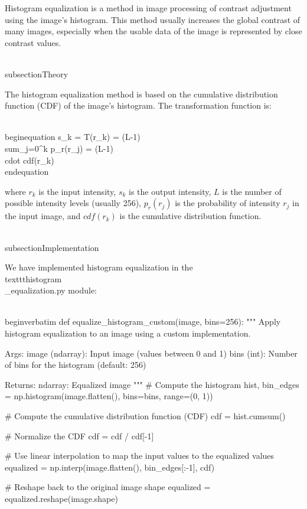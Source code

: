 Histogram equalization is a method in image processing of contrast adjustment using the image's histogram. This method usually increases the global contrast of many images, especially when the usable data of the image is represented by close contrast values.

\\subsection{Theory}

The histogram equalization method is based on the cumulative distribution function (CDF) of the image's histogram. The transformation function is:

\\begin{equation}
s_k = T(r_k) = (L-1) \\sum_{j=0}^{k} p_r(r_j) = (L-1) \\cdot cdf(r_k)
\\end{equation}

where $r_k$ is the input intensity, $s_k$ is the output intensity, $L$ is the number of possible intensity levels (usually 256), $p_r(r_j)$ is the probability of intensity $r_j$ in the input image, and $cdf(r_k)$ is the cumulative distribution function.

\\subsection{Implementation}

We have implemented histogram equalization in the \\texttt{histogram\\_equalization.py} module:

\\begin{verbatim}
def equalize_histogram_custom(image, bins=256):
    """
    Apply histogram equalization to an image using a custom implementation.
    
    Args:
        image (ndarray): Input image (values between 0 and 1)
        bins (int): Number of bins for the histogram (default: 256)
        
    Returns:
        ndarray: Equalized image
    """
    # Compute the histogram
    hist, bin_edges = np.histogram(image.flatten(), bins=bins, range=(0, 1))
    
    # Compute the cumulative distribution function (CDF)
    cdf = hist.cumsum()
    
    # Normalize the CDF
    cdf = cdf / cdf[-1]
    
    # Use linear interpolation to map the input values to the equalized values
    equalized = np.interp(image.flatten(), bin_edges[:-1], cdf)
    
    # Reshape back to the original image shape
    equalized = equalized.reshape(image.shape)
    
